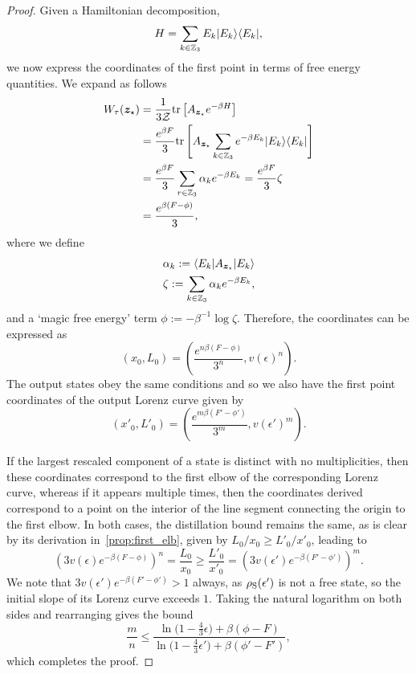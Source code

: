 \documentclass[pra,
aps,
twocolumn,
superscriptaddress,
groupedaddress,
nofootinbib,
reprint
]{revtex4-1}
\begin{document}
\begin{proof}
Given a Hamiltonian decomposition,
\begin{equation}
	H = \sum_{k \in \mathbb{Z}_3} E_k |E_k\rangle\langle E_k|,
\end{equation}
we now express the coordinates of the first point in terms of free energy quantities. We expand as follows
\begin{align}
	W_{\tau}(\bm{z}_\star) &= \frac{1}{3\mathcal{Z}}\mbox{tr}\left[ A_{\bm{z}_\star}e^{-\beta H} \right] \nonumber\\
	&= \frac{e^{\beta F}}{3} \mbox{tr}\left[ A_{\bm{z}_\star}\sum_{k \in \mathbb{Z}_3} e^{-\beta E_k} |E_k\rangle\langle E_k| \right] \\
	&= \frac{e^{\beta F}}{3} \sum_{r \in \mathbb{Z}_3} \alpha_k e^{-\beta E_k}
	= \frac{e^{\beta F}}{3} \zeta \\
	&= \frac{e^{\beta (F - \phi)}}{3},
\end{align}
where we define
\begin{align}
\alpha_k := \langle E_k |A_{\bm{z}_\star} |E_k\rangle \\
\zeta :=  \sum_{k \in \mathbb{Z}_3} \alpha_k e^{-\beta E_k},
\end{align}
and a `magic free energy' term $\phi := -\beta^{-1} \log \zeta$.
Therefore, the coordinates can be expressed as
\begin{equation}
	(x_0, L_0) = \left( \frac{e^{n\beta (F - \phi)}}{3^n}, v(\epsilon)^n \right).
\end{equation}
The output states obey the same conditions and so we also have the first point coordinates of the output Lorenz curve given by
\begin{equation}
	(x'_0, L'_0) = \left( \frac{e^{m\beta (F' - \phi')}}{3^m}, v(\epsilon')^m \right).
\end{equation}

If the largest rescaled component of a state is distinct with no multiplicities, then these coordinates correspond to the first elbow of the corresponding Lorenz curve, whereas if it appears multiple times, then the coordinates derived correspond to a point on the interior of the line segment connecting the origin to the first elbow.
In both cases, the distillation bound remains the same, as is clear by its derivation in~\cref{prop:first_elb}, given by $L_0/x_0 \geq L'_0/x'_0$, leading to
\begin{equation}
	\left( 3v(\epsilon)e^{-\beta (F - \phi)} \right)^{n} = \frac{L_0}{x_0}
	\geq \frac{L'_0}{x'_0} = \left( 3v(\epsilon')e^{-\beta (F' - \phi')} \right)^{m}.
\end{equation}
We note that $3v(\epsilon')e^{-\beta (F' - \phi')} > 1$ always, as $\rho_{\rm{S}}(\epsilon')$ is not a free state, so the initial slope of its Lorenz curve exceeds $1$.
Taking the natural logarithm on both sides and rearranging gives the bound
\begin{equation}
	\frac{m}{n} \leq \dfrac{\ln{\big( 1-\frac{4}{3}\epsilon \big)} + \beta (\phi - F)}{\ln{\big( 1-\frac{4}{3}\epsilon' \big)} + \beta (\phi' - F')},
\end{equation}
which completes the proof.
\end{proof}
\end{document}
